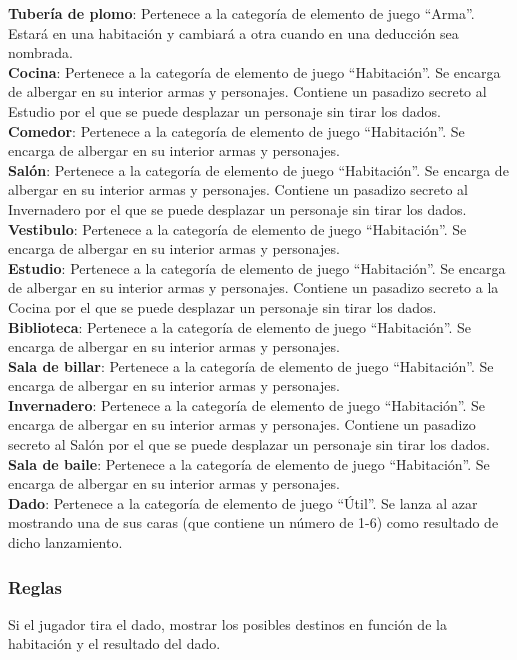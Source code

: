 \textbf{Tubería de plomo}: Pertenece a la categoría de elemento de juego “Arma”. Estará en una habitación y cambiará a otra cuando en una deducción sea nombrada.\\
\textbf{Cocina}: Pertenece a la categoría de elemento de juego “Habitación”. Se encarga de albergar en su interior armas y personajes. Contiene un pasadizo secreto al Estudio por el que se puede desplazar un personaje sin tirar los dados.\\
\textbf{Comedor}: Pertenece a la categoría de elemento de juego “Habitación”. Se encarga de albergar en su interior armas y personajes.\\
\textbf{Salón}: Pertenece a la categoría de elemento de juego “Habitación”. Se encarga de albergar en su interior armas y personajes. Contiene un pasadizo secreto al Invernadero por el que se puede desplazar un personaje sin tirar los dados.\\
\textbf{Vestibulo}: Pertenece a la categoría de elemento de juego “Habitación”. Se encarga de albergar en su interior armas y personajes.\\
\textbf{Estudio}: Pertenece a la categoría de elemento de juego “Habitación”. Se encarga de albergar en su interior armas y personajes. Contiene un pasadizo secreto a la Cocina por el que se puede desplazar un personaje sin tirar los dados.\\
\textbf{Biblioteca}: Pertenece a la categoría de elemento de juego “Habitación”. Se encarga de albergar en su interior armas y personajes.\\
\textbf{Sala de billar}: Pertenece a la categoría de elemento de juego “Habitación”. Se encarga de albergar en su interior armas y personajes.\\
\textbf{Invernadero}: Pertenece a la categoría de elemento de juego “Habitación”. Se encarga de albergar en su interior armas y personajes. Contiene un pasadizo secreto al Salón por el que se puede desplazar un personaje sin tirar los dados.\\
\textbf{Sala de baile}: Pertenece a la categoría de elemento de juego “Habitación”. Se encarga de albergar en su interior armas y personajes.\\
\textbf{Dado}: Pertenece a la categoría de elemento de juego “Útil”. Se lanza al azar mostrando una de sus caras (que contiene un número de 1-6) como resultado de dicho lanzamiento.\\

\subsubsection{Reglas}
Si el jugador tira el dado, mostrar los posibles destinos en función de la habitación y el resultado del dado.\\

